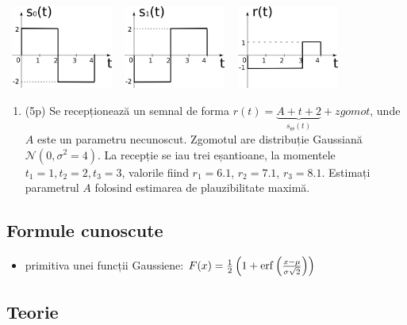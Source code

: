 \documentclass[12pt,]{scrartcl}
\providecommand{\tightlist}{%
  \setlength{\itemsep}{0pt}\setlength{\parskip}{0pt}}
\begin{document}
~\includegraphics[width=0.25000\textwidth]{fig/SIG_Haar1.png} ~
\includegraphics[width=0.25000\textwidth]{fig/SIG_Haar2.png} ~
\includegraphics[width=0.25000\textwidth]{fig/SIG_Rec.png}

\smallbreak

\begin{enumerate}
\def\labelenumi{\arabic{enumi}.}
\setcounter{enumi}{3}
\tightlist
\item
  (5p) Se recepționează un semnal de forma
  \(r(t) = \underbrace{A + t + 2}_{s_\Theta(t)} + zgomot\), unde \(A\)
  este un parametru necunoscut. Zgomotul are distribuție Gaussiană
  \(\mathcal{N}(0,\sigma^2=4)\). La recepție se iau trei eșantioane, la
  momentele \(t_1 = 1, t_2 = 2, t_3 = 3\), valorile fiind \(r_1 = 6.1\),
  \(r_2 = 7.1\), \(r_3 = 8.1\). Estimați parametrul \(A\) folosind
  estimarea de plauzibilitate maximă.
\end{enumerate}

\subsection{Formule cunoscute}\label{formule-cunoscute}

\begin{itemize}
\tightlist
\item
  primitiva unei funcții Gaussiene:
  \(F(x) = \frac{1}{2}\left(1 + \operatorname{erf}\left(\frac{x - \mu}{\sigma \sqrt{2}}\right)\right)\)
\end{itemize}

\subsection{Teorie}\label{teorie}
\end{document}

